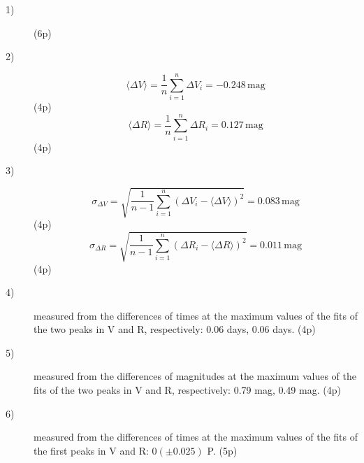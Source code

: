 \begin{description}
\item[1)] %
  \hfill(6p)

\item[2)]
  \[ \langle \Delta V \rangle = \frac{1}{n} \sum_{i=1}^{n} \Delta V_i
     = -0.248\,\mathrm{mag} \]
  \hfill(4p)
  \[ \langle \Delta R \rangle = \frac{1}{n} \sum_{i=1}^{n} \Delta R_i
     = 0.127\,\mathrm{mag} \]
  \hfill(4p)

\item[3)]
  \[ \sigma_{\Delta V} = \sqrt{ \frac{1}{n-1} \sum_{i=1}^{n}
     \left( \Delta V_i - \langle \Delta V \rangle \right)^2 }
     = 0.083\,\mathrm{mag} \]
  \hfill(4p)
  \[ \sigma_{\Delta R} = \sqrt{ \frac{1}{n-1} \sum_{i=1}^{n}
     \left( \Delta R_i - \langle \Delta R \rangle \right)^2 }
     = 0.011\,\mathrm{mag} \]
  \hfill(4p)

\item[4)] measured from the differences of times at the maximum values of the
  fits of the two peaks in V and R, respectively: 0.06 days, 0.06 days.
  \hfill(4p)

\item[5)] measured from the differences of magnitudes at the maximum values of
  the fits of the two peaks in V and R, respectively: 0.79 mag, 0.49 mag.
  \hfill(4p)

\item[6)] measured from the differences of times at the maximum values of the
  fits of the first peaks in V and R: $0(\pm 0.025)$ P. \hfill(5p)
\end{description}
